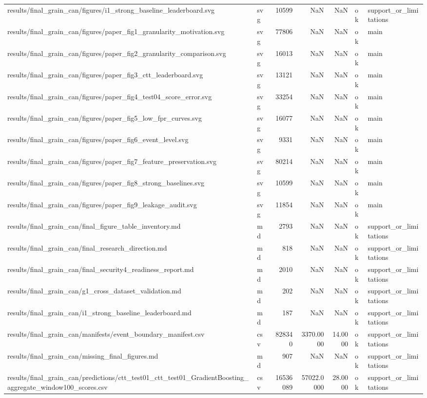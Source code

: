 \begin{tabular}{llrrrll}
results/final_grain_can/figures/i1_strong_baseline_leaderboard.svg & svg & 10599 & NaN & NaN & ok & support_or_limitations \\
results/final_grain_can/figures/paper_fig1_granularity_motivation.svg & svg & 77806 & NaN & NaN & ok & main \\
results/final_grain_can/figures/paper_fig2_granularity_comparison.svg & svg & 16013 & NaN & NaN & ok & main \\
results/final_grain_can/figures/paper_fig3_ctt_leaderboard.svg & svg & 13121 & NaN & NaN & ok & main \\
results/final_grain_can/figures/paper_fig4_test04_score_error.svg & svg & 33254 & NaN & NaN & ok & main \\
results/final_grain_can/figures/paper_fig5_low_fpr_curves.svg & svg & 16077 & NaN & NaN & ok & main \\
results/final_grain_can/figures/paper_fig6_event_level.svg & svg & 9331 & NaN & NaN & ok & main \\
results/final_grain_can/figures/paper_fig7_feature_preservation.svg & svg & 80214 & NaN & NaN & ok & main \\
results/final_grain_can/figures/paper_fig8_strong_baselines.svg & svg & 10599 & NaN & NaN & ok & main \\
results/final_grain_can/figures/paper_fig9_leakage_audit.svg & svg & 11854 & NaN & NaN & ok & main \\
results/final_grain_can/final_figure_table_inventory.md & md & 2793 & NaN & NaN & ok & support_or_limitations \\
results/final_grain_can/final_research_direction.md & md & 818 & NaN & NaN & ok & support_or_limitations \\
results/final_grain_can/final_security4_readiness_report.md & md & 2010 & NaN & NaN & ok & support_or_limitations \\
results/final_grain_can/g1_cross_dataset_validation.md & md & 202 & NaN & NaN & ok & support_or_limitations \\
results/final_grain_can/i1_strong_baseline_leaderboard.md & md & 187 & NaN & NaN & ok & support_or_limitations \\
results/final_grain_can/manifests/event_boundary_manifest.csv & csv & 828340 & 3370.0000 & 14.0000 & ok & support_or_limitations \\
results/final_grain_can/missing_final_figures.md & md & 907 & NaN & NaN & ok & support_or_limitations \\
results/final_grain_can/predictions/ctt_test01_ctt_test01_GradientBoosting_aggregate_window100_scores.csv & csv & 16536089 & 57022.0000 & 28.0000 & ok & support_or_limitations \\

\end{tabular}
